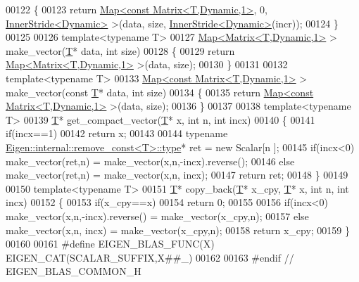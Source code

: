 \begin{DoxyCode}
00122 \{
00123   \textcolor{keywordflow}{return} \hyperlink{group___core___module_class_eigen_1_1_map}{Map<const Matrix<T,Dynamic,1>}, 0, 
      \hyperlink{class_eigen_1_1_inner_stride}{InnerStride<Dynamic>} >(data, size, \hyperlink{class_eigen_1_1_inner_stride}{InnerStride<Dynamic>}(incr));
00124 \}
00125 
00126 \textcolor{keyword}{template}<\textcolor{keyword}{typename} T>
00127 \hyperlink{group___core___module_class_eigen_1_1_map}{Map<Matrix<T,Dynamic,1>} > make\_vector(\hyperlink{group___sparse_core___module}{T}* data, \textcolor{keywordtype}{int} size)
00128 \{
00129   \textcolor{keywordflow}{return} \hyperlink{group___core___module_class_eigen_1_1_map}{Map<Matrix<T,Dynamic,1>} >(data, size);
00130 \}
00131 
00132 \textcolor{keyword}{template}<\textcolor{keyword}{typename} T>
00133 \hyperlink{group___core___module_class_eigen_1_1_map}{Map<const Matrix<T,Dynamic,1>} > make\_vector(\textcolor{keyword}{const} \hyperlink{group___sparse_core___module}{T}* data, \textcolor{keywordtype}{int} size)
00134 \{
00135   \textcolor{keywordflow}{return} \hyperlink{group___core___module_class_eigen_1_1_map}{Map<const Matrix<T,Dynamic,1>} >(data, size);
00136 \}
00137 
00138 \textcolor{keyword}{template}<\textcolor{keyword}{typename} T>
00139 \hyperlink{group___sparse_core___module}{T}* get\_compact\_vector(\hyperlink{group___sparse_core___module}{T}* x, \textcolor{keywordtype}{int} n, \textcolor{keywordtype}{int} incx)
00140 \{
00141   \textcolor{keywordflow}{if}(incx==1)
00142     \textcolor{keywordflow}{return} x;
00143 
00144   \textcolor{keyword}{typename} \hyperlink{group___sparse_core___module}{Eigen::internal::remove\_const<T>::type}* ret = \textcolor{keyword}{new} Scalar[n
      ];
00145   \textcolor{keywordflow}{if}(incx<0) make\_vector(ret,n) = make\_vector(x,n,-incx).reverse();
00146   \textcolor{keywordflow}{else}       make\_vector(ret,n) = make\_vector(x,n, incx);
00147   \textcolor{keywordflow}{return} ret;
00148 \}
00149 
00150 \textcolor{keyword}{template}<\textcolor{keyword}{typename} T>
00151 \hyperlink{group___sparse_core___module}{T}* copy\_back(\hyperlink{group___sparse_core___module}{T}* x\_cpy, \hyperlink{group___sparse_core___module}{T}* x, \textcolor{keywordtype}{int} n, \textcolor{keywordtype}{int} incx)
00152 \{
00153   \textcolor{keywordflow}{if}(x\_cpy==x)
00154     \textcolor{keywordflow}{return} 0;
00155 
00156   \textcolor{keywordflow}{if}(incx<0) make\_vector(x,n,-incx).reverse() = make\_vector(x\_cpy,n);
00157   \textcolor{keywordflow}{else}       make\_vector(x,n, incx)           = make\_vector(x\_cpy,n);
00158   \textcolor{keywordflow}{return} x\_cpy;
00159 \}
00160 
00161 \textcolor{preprocessor}{#define EIGEN\_BLAS\_FUNC(X) EIGEN\_CAT(SCALAR\_SUFFIX,X##\_)}
00162 
00163 \textcolor{preprocessor}{#endif // EIGEN\_BLAS\_COMMON\_H}
\end{DoxyCode}
